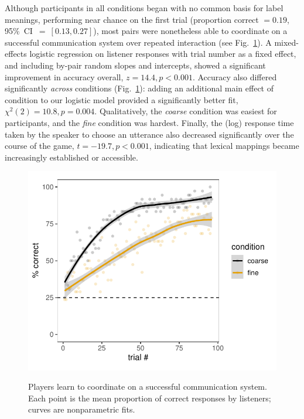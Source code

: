 Although participants in all conditions began with no common basis for label meanings, performing near chance on the first trial (proportion correct $= 0.19$, 95\%~CI~$=~[0.13, 0.27]$), most pairs were nonetheless able to coordinate on a successful communication system over repeated interaction (see Fig.\ \ref{fig:context_accuracy}). 
A mixed-effects logistic regression on listener responses with trial number as a fixed effect, and including by-pair random slopes and intercepts, showed a significant improvement in accuracy overall, $z = 14.4, p < 0.001$. 
Accuracy also differed significantly \emph{across} conditions (Fig.\ \ref{fig:context_accuracy}): adding an additional main effect of condition to our logistic model provided a significantly better fit, $\chi^2(2) = 10.8, p = 0.004$. 
Qualitatively, the \emph{coarse} condition was easiest for participants, and the \emph{fine} condition was hardest. 
Finally, the (log) response time taken by the speaker to choose an utterance also decreased significantly over the course of the game, $t = -19.7, p < 0.001$, indicating that lexical mappings became increasingly established or accessible.

\begin{figure}[t]
\begin{center}
{\includegraphics[scale=0.65]{./figures/sec2_empirical_accuracy.pdf}}
{\caption{{Players learn to coordinate on a successful communication system. Each point is the mean proportion of correct responses by listeners; curves are nonparametric fits.  %
\label{fig:context_accuracy}}}}
\vspace{-3ex}
\end{center}
\end{figure}


